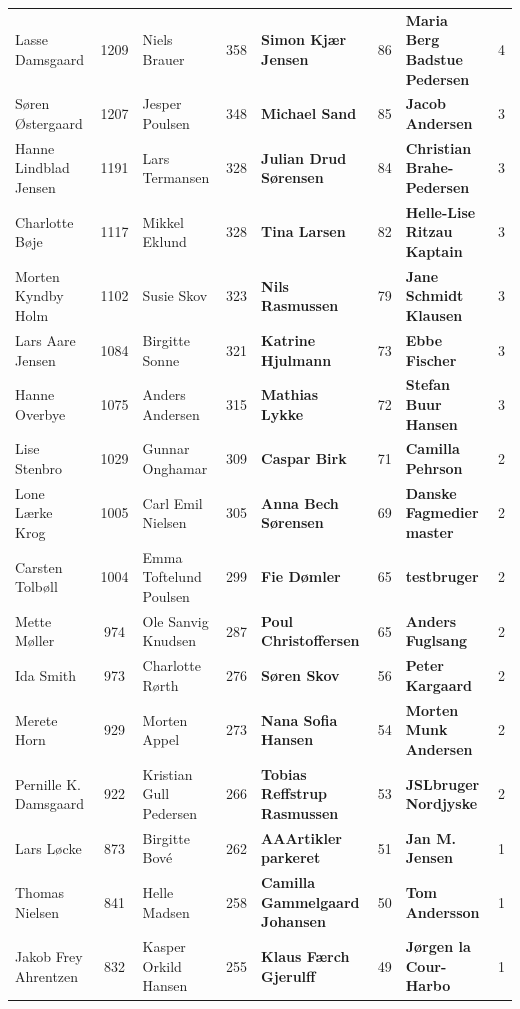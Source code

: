 \begin{table}[h]
\begin{tabular}{l|c|l|c|l|c|l|c}
		Lasse Damsgaard & 1209 & Niels Brauer & 358 & \textbf{Simon Kjær Jensen} & 86 & \textbf{Maria Berg Badstue Pedersen} & 4 \\
		Søren Østergaard & 1207 & Jesper Poulsen & 348 & \textbf{Michael Sand} & 85 & \textbf{Jacob Andersen} & 3 \\
		Hanne Lindblad Jensen & 1191 & Lars Termansen & 328 & \textbf{Julian Drud Sørensen} & 84 & \textbf{Christian Brahe-Pedersen} & 3 \\
		Charlotte Bøje & 1117 & Mikkel Eklund & 328 & \textbf{Tina Larsen} & 82 & \textbf{Helle-Lise Ritzau Kaptain} & 3 \\
		Morten Kyndby Holm & 1102 & Susie Skov & 323 & \textbf{Nils Rasmussen} & 79 & \textbf{Jane Schmidt Klausen} & 3 \\
		Lars Aare Jensen & 1084 & Birgitte Sonne & 321 & \textbf{Katrine Hjulmann} & 73 & \textbf{Ebbe Fischer} & 3 \\
		Hanne Overbye & 1075 & Anders Andersen & 315 & \textbf{Mathias Lykke} & 72 & \textbf{Stefan Buur Hansen} & 3 \\
		Lise Stenbro & 1029 & Gunnar Onghamar & 309 & \textbf{Caspar Birk} & 71 & \textbf{Camilla Pehrson} & 2 \\
		Lone Lærke Krog & 1005 & Carl Emil Nielsen & 305 & \textbf{Anna Bech Sørensen} & 69 & \textbf{Danske Fagmedier master} & 2 \\
		Carsten Tolbøll & 1004 & Emma Toftelund Poulsen & 299 & \textbf{Fie Dømler} & 65 & \textbf{testbruger} & 2 \\
		Mette Møller & 974 & Ole Sanvig Knudsen & 287 & \textbf{Poul Christoffersen} & 65 & \textbf{Anders Fuglsang} & 2 \\
		Ida Smith & 973 & Charlotte Rørth & 276 & \textbf{Søren Skov} & 56 & \textbf{Peter Kargaard} & 2 \\
		Merete Horn & 929 & Morten Appel & 273 & \textbf{Nana Sofia Hansen} & 54 & \textbf{Morten Munk Andersen} & 2 \\
		Pernille K. Damsgaard & 922 & Kristian Gull Pedersen & 266 & \textbf{Tobias Reffstrup Rasmussen} & 53 & \textbf{JSLbruger Nordjyske} & 2 \\
		Lars Løcke & 873 & Birgitte Bové & 262 & \textbf{AAArtikler parkeret} & 51 & \textbf{Jan M. Jensen} & 1 \\
		Thomas Nielsen & 841 & Helle Madsen & 258 & \textbf{Camilla Gammelgaard Johansen} & 50 & \textbf{Tom Andersson} & 1 \\
		Jakob Frey Ahrentzen & 832 & Kasper Orkild Hansen & 255 & \textbf{Klaus Færch Gjerulff} & 49 & \textbf{Jørgen la Cour-Harbo} & 1 \\

\end{tabular}
\end{table}
